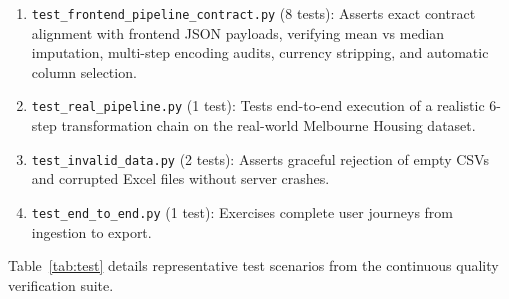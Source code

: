 \begin{enumerate}
  \item \texttt{test\_frontend\_pipeline\_contract.py} (8 tests): Asserts exact contract alignment with frontend JSON payloads, verifying mean vs median imputation, multi-step encoding audits, currency stripping, and automatic column selection.
  \item \texttt{test\_real\_pipeline.py} (1 test): Tests end-to-end execution of a realistic 6-step transformation chain on the real-world Melbourne Housing dataset.
  \item \texttt{test\_invalid\_data.py} (2 tests): Asserts graceful rejection of empty CSVs and corrupted Excel files without server crashes.
  \item \texttt{test\_end\_to\_end.py} (1 test): Exercises complete user journeys from ingestion to export.
\end{enumerate}

Table~\ref{tab:test} details representative test scenarios from the continuous quality verification suite.

